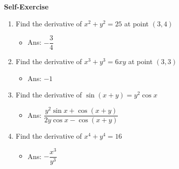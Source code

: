 \documentclass[t]{beamer}
\theoremstyle{plain}
\theoremstyle{definition}
\newcounter{heading}
\newcommand{\makeheading}[1]{\medskip\begin{large}\noindent\textbf{{#1}}\end{large}\smallskip}
\begin{document}
\begin{frame}
\makeheading{Self-Exercise}

\begin{enumerate}

\item Find the derivative of $x^2 + y^2 = 25$ at point $(3, 4)$
\begin{itemize}
	\item Ans: $- \dfrac{3}{4}$
\end{itemize}

\item Find the derivative of $x^3 + y^3 = 6xy$ at point $(3, 3)$ 
\begin{itemize}
	\item Ans: $-1$
\end{itemize}

\item Find the derivative of $\sin{(x + y)} = y^2 \cos{x}$
\begin{itemize}
	\item Ans: $\dfrac{y^2\sin{x} + \cos{(x+y)}}{2y\cos{x} - \cos{(x+y)}}$
\end{itemize}

\item Find the derivative of $x^4 + y^4 = 16$
\begin{itemize}
	\item Ans: $-\dfrac{x^3}{y^3}$
\end{itemize}

\end{enumerate}

\end{frame}
\end{document}
